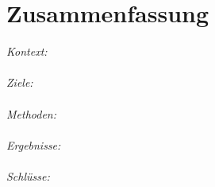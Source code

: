 \cleardoublepage\chapter*{Zusammenfassung}

\thispagestyle{NoHeader}

\textit{Kontext:}
\\ \ \\

\textit{Ziele:}
\\ \ \\

\textit{Methoden:}
\\ \ \\

\textit{Ergebnisse:}
\\ \ \\

\textit{Schlüsse:}
